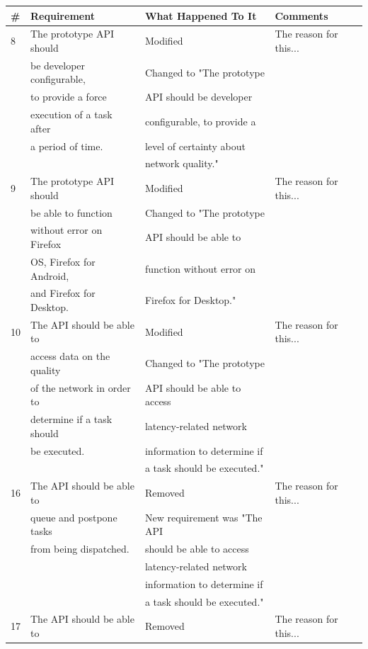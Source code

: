 \documentclass[12pt]{article}
\begin{document}
\begin{tabular}{|l|l|l|l|}
\hline
\#  & Requirement 				& What Happened To It 		  & Comments \\ \hline
8 	& The prototype API should	& Modified 					  & The reason for this... \\
	& be developer configurable,& Changed to "The prototype   & \\
	& to provide a force		& API should be developer 	  & \\
	& execution of a task after	& configurable, to provide a  & \\
	& a period of time.			& level of certainty about 	  & \\
	&							& network quality."			  & \\ \hline
9 	& The prototype API should  & Modified 				      & The reason for this... \\
	& be able to function  	   	& Changed to "The prototype   & \\
	& without error on Firefox  & API should be able to 	  & \\
	& OS, Firefox for Android,	& function without error on   & \\
	& and Firefox for Desktop.	& Firefox for Desktop."		  & \\ \hline
10 	& The API should be able to & Modified 				      & The reason for this... \\
	& access data on the quality& Changed to "The prototype   & \\ 
	& of the network in order to& API should be able to access& \\
	& determine if a task should& latency-related network     & \\
	& be executed.				& information to determine if & \\
	&							& a task should be executed." & \\ \hline
16 	& The API should be able to & Removed					  & The reason for this... \\
	& queue and postpone tasks	& New requirement was "The API& \\
	& from being dispatched.	& should be able to access 	  & \\
	&							& latency-related network 	  & \\
	&							& information to determine if & \\
	&							& a task should be executed." & \\ \hline
17 	& The API should be able to & Removed 					  & The reason for this... \\

\end{tabular}
\end{document}
